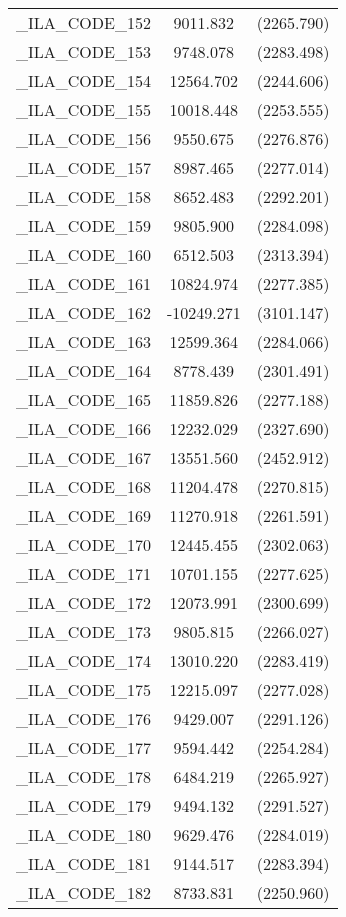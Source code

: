 {\begin{table}[htbp]
\begin{tabular}{l c c }
\_ILA\_CODE\_152  &  9011.832  & (2265.790)\\
\_ILA\_CODE\_153  &  9748.078  & (2283.498)\\
\_ILA\_CODE\_154  &  12564.702  & (2244.606)\\
\_ILA\_CODE\_155  &  10018.448  & (2253.555)\\
\_ILA\_CODE\_156  &  9550.675  & (2276.876)\\
\_ILA\_CODE\_157  &  8987.465  & (2277.014)\\
\_ILA\_CODE\_158  &  8652.483  & (2292.201)\\
\_ILA\_CODE\_159  &  9805.900  & (2284.098)\\
\_ILA\_CODE\_160  &  6512.503  & (2313.394)\\
\_ILA\_CODE\_161  &  10824.974  & (2277.385)\\
\_ILA\_CODE\_162  &  -10249.271  & (3101.147)\\
\_ILA\_CODE\_163  &  12599.364  & (2284.066)\\
\_ILA\_CODE\_164  &  8778.439  & (2301.491)\\
\_ILA\_CODE\_165  &  11859.826  & (2277.188)\\
\_ILA\_CODE\_166  &  12232.029  & (2327.690)\\
\_ILA\_CODE\_167  &  13551.560  & (2452.912)\\
\_ILA\_CODE\_168  &  11204.478  & (2270.815)\\
\_ILA\_CODE\_169  &  11270.918  & (2261.591)\\
\_ILA\_CODE\_170  &  12445.455  & (2302.063)\\
\_ILA\_CODE\_171  &  10701.155  & (2277.625)\\
\_ILA\_CODE\_172  &  12073.991  & (2300.699)\\
\_ILA\_CODE\_173  &  9805.815  & (2266.027)\\
\_ILA\_CODE\_174  &  13010.220  & (2283.419)\\
\_ILA\_CODE\_175  &  12215.097  & (2277.028)\\
\_ILA\_CODE\_176  &  9429.007  & (2291.126)\\
\_ILA\_CODE\_177  &  9594.442  & (2254.284)\\
\_ILA\_CODE\_178  &  6484.219  & (2265.927)\\
\_ILA\_CODE\_179  &  9494.132  & (2291.527)\\
\_ILA\_CODE\_180  &  9629.476  & (2284.019)\\
\_ILA\_CODE\_181  &  9144.517  & (2283.394)\\
\_ILA\_CODE\_182  &  8733.831  & (2250.960)\\

\end{tabular}
\end{table}}
